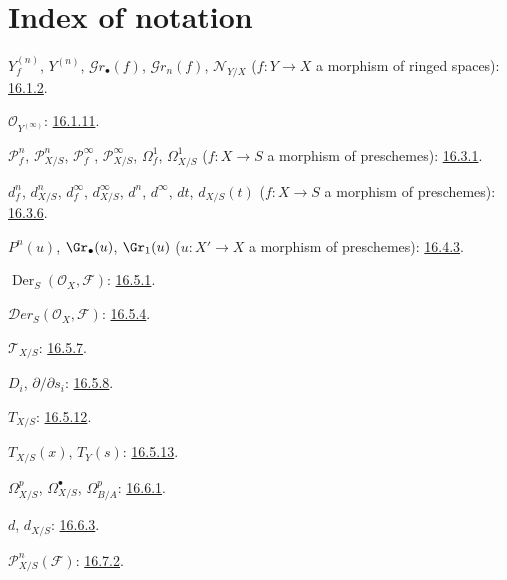\clearpage
{}
{}
\section*{Index of notation}

\begingroup
\small
\setlength{\parindent}{0pt}
\setlength{\parskip}{1.5pt}
\newcommand{\EGAIVidxref}[1]{\hyperref[IV.#1]{#1}}

$Y_f^{(n)}$, $Y^{(n)}$, $\mathcal{G}r_{\bullet}(f)$,
$\mathcal{G}r_n(f)$, $\mathcal{N}_{Y/X}$
($f:Y\to X$ a morphism of ringed spaces): {\hyperlink{ega4.c04.def.16-1-2}{16.1.2}}.

$\mathcal{O}_{Y^{(\infty)}}$: {\hyperlink{ega4.c04.rem.16-1-11}{16.1.11}}.

$\mathcal{P}^{n}_{f}$, $\mathcal{P}^{n}_{X/S}$,
$\mathcal{P}^{\infty}_{f}$, $\mathcal{P}^{\infty}_{X/S}$,
$\Omega^{1}_{f}$, $\Omega^{1}_{X/S}$
($f:X\to S$ a morphism of preschemes): {\hyperlink{ega4.c04.def.16-3-1}{16.3.1}}.

$d^{n}_{f}$, $d^{n}_{X/S}$, $d^{\infty}_{f}$,
$d^{\infty}_{X/S}$, $d^{n}$, $d^{\infty}$, $dt$, $d_{X/S}(t)$
($f:X\to S$ a morphism of preschemes): {\hyperlink{ega4.c04.def.16-3-6}{16.3.6}}.

$P^{n}(u)$, $\Gr_{\bullet}(u)$, $\Gr_{1}(u)$
($u:X'\to X$ a morphism of preschemes): {\hyperlink{ega4.c04.statement.16-4-3}{16.4.3}}.

$\operatorname{Der}_{S}(\mathcal{O}_{X},\mathcal{F})$:
{\hyperlink{ega4.c04.statement.16-5-1}{16.5.1}}.

$\mathcal{D}er_{S}(\mathcal{O}_{X},\mathcal{F})$:
{\hyperlink{ega4.c04.statement.16-5-4}{16.5.4}}.

$\mathcal{T}_{X/S}$: {\hyperlink{ega4.c04.statement.16-5-7}{16.5.7}}.

$D_i$, $\partial/\partial s_i$: {\hyperlink{ega4.c04.statement.16-5-8}{16.5.8}}.

$T_{X/S}$: {\hyperlink{ega4.c04.statement.16-5-12}{16.5.12}}.

$T_{X/S}(x)$, $T_Y(s)$: {\hyperlink{ega4.c04.statement.16-5-13}{16.5.13}}.

$\Omega^p_{X/S}$, $\Omega^\bullet_{X/S}$, $\Omega^p_{B/A}$:
{\hyperlink{ega4.c04.statement.16-6-1}{16.6.1}}.

$d$, $d_{X/S}$: {\hyperlink{ega4.c04.def.16-6-3}{16.6.3}}.

$\mathcal{P}^n_{X/S}(\mathcal{F})$: {\hyperlink{ega4.c04.statement.16-7-2}{16.7.2}}.

